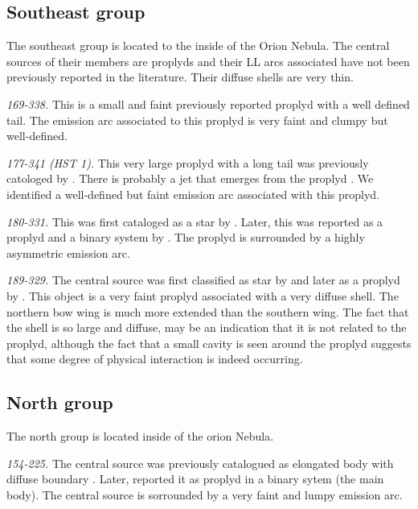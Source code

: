 \documentclass[apj, twocolumn]{aastex63}
\renewcommand\clearpage{}
\begin{document}
\clearpage
\subsection{Southeast group}
\label{sec:se-group}



The southeast group is located to the inside of the Orion Nebula.
The central sources of their members are proplyds and their LL arcs
associated have not been previously reported in the literature.
Their diffuse shells are very thin. 

\textit{169-338.} This is a small and faint previously reported
proplyd \citep{ODell:1994a, Ricci:2008a} with a well defined tail.
The emission arc associated to this proplyd is very faint and clumpy
but well-defined. 

\textit{177-341 (HST 1).} This very large proplyd with a long tail was
previously catologed by \citet{ODell:1994a, Ricci:2008a}. There is
probably a jet that emerges from the proplyd \citep{Bally:2000a}.
We identified a well-defined but faint  emission arc associated with
this proplyd.

\textit{180-331.} This was first cataloged as a star by
\citet{ODell:1996a}. Later, this was reported as a proplyd and a
binary system by \citet{Ricci:2008a}. The proplyd is surrounded by
a highly asymmetric emission arc.

\textit{189-329.}  The central source was first classified as star
by \citet{ODell:1996a} and later as a proplyd by \citet{Ricci:2008a}.
This object is a very faint proplyd associated with a very diffuse
shell. The northern bow wing is much more extended than the southern
wing. The fact that the shell is so large and diffuse, may be an
indication that it is not related to the proplyd, although the fact
that a small cavity is seen  around the proplyd suggests that some
degree of physical interaction is indeed occurring.


\clearpage
\subsection{North group}
\label{sec:n-group}



The north group is located inside of the orion Nebula.


\textit{154-225.} The central source was previously catalogued
as elongated body with diffuse boundary \citep{ODell:1996a}.
Later, \citet{Ricci:2008a} reported it as proplyd in a binary
sytem (the main body). The central source is sorrounded by a
very faint and lumpy emission arc.
\end{document}
